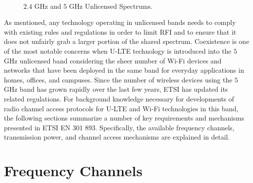\begin{figure}[!ht] 	
	\\
	\caption{$2.4$ GHz and $5$ GHz Unlicensed Spectrums.}
	\label{figs:2-5GHz-spectrum}
\end{figure}

As mentioned, any technology operating in unlicensed bands needs to comply with existing rules and regulations in order to limit RFI and to ensure that it does not unfairly grab a larger portion of the shared spectrum.  Coexistence is one of the most notable concerns when U-LTE technology is introduced into the $5$ GHz unlicensed band considering the sheer number of Wi-Fi devices and networks that have been deployed in the same band for everyday applications in homes, offices, and campuses. Since the number of wireless devices using the $5$ GHz band has grown rapidly over the last few years, ETSI has updated its related regulations. For background knowledge necessary for developments of radio channel access protocols for U-LTE and Wi-Fi technologies in this band, the following sections summarize a number of key requirements and mechanisms presented in ETSI EN 301 893. Specifically, the available frequency channels, transmission power, and channel access mechanisms are explained in detail.

\section{Frequency Channels}

